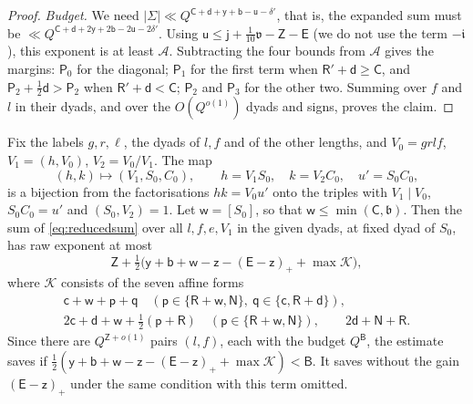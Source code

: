 \documentclass[11pt,colorlinks]{charlie}
\begin{document}
\begin{proof}
\emph{Budget.} We need $|\Sigma|\ll Q^{\mathsf C+\mathsf d+\mathsf y+\mathsf b-\mathsf u-\delta'}$, that is, the expanded sum must be $\ll Q^{\mathsf C+\mathsf d+2\mathsf y+2\mathsf b-2\mathsf u-2\delta'}$. Using $\mathsf u\le\mathsf j+\frac1{10}\mathfrak v-\mathsf Z-\mathsf E$ (we do not use the term $-\mathfrak i$), this exponent is at least $\mathcal A$. Subtracting the four bounds from $\mathcal A$ gives the margins: $\mathsf P_0$ for the diagonal; $\mathsf P_1$ for the first term when $\mathsf R'+\mathsf d\ge\mathsf C$, and $\mathsf P_2+\frac12\mathsf d>\mathsf P_2$ when $\mathsf R'+\mathsf d<\mathsf C$; $\mathsf P_2$ and $\mathsf P_3$ for the other two. Summing over $f$ and $l$ in their dyads, and over the $O(Q^{o(1)})$ dyads and signs, proves the claim.
\end{proof}

\begin{lemma}\label{lem:direct}
Fix the labels $g,r,\ell$, the dyads of $l,f$ and of the other lengths, and $V_0=grlf$, $V_1=(h,V_0)$, $V_2=V_0/V_1$. The map
\[
 (h,k)\longmapsto(V_1,S_0,C_0),\qquad h=V_1S_0,\quad k=V_2C_0,\quad u'=S_0C_0,
\]
is a bijection from the factorisations $hk=V_0u'$ onto the triples with $V_1\mid V_0$, $S_0C_0=u'$ and $(S_0,V_2)=1$. Let $\mathsf w=[S_0]$, so that $\mathsf w\le\min(\mathsf C,\mathfrak b)$. Then the sum of \eqref{eq:reducedsum} over all $l,f,e,V_1$ in the given dyads, at fixed dyad of $S_0$, has raw exponent at most
\[
 \mathsf Z+\tfrac12\big(\mathsf y+\mathsf b+\mathsf w-\mathsf z-(\mathsf E-\mathsf z)_+ +\max\mathcal K\big),
\]
where $\mathcal K$ consists of the seven affine forms
\begin{equation}\label{eq:Kset}
 \begin{gathered}
 \mathsf c+\mathsf w+\mathsf p+\mathsf q\quad(\mathsf p\in\{\mathsf R+\mathsf w,\mathsf N\},\ \mathsf q\in\{\mathsf c,\mathsf R+\mathsf d\}),\\
 2\mathsf c+\mathsf d+\mathsf w+\tfrac12(\mathsf p+\mathsf R)\quad(\mathsf p\in\{\mathsf R+\mathsf w,\mathsf N\}),\qquad
 2\mathsf d+\mathsf N+\mathsf R .
 \end{gathered}
\end{equation}
Since there are $Q^{\mathsf Z+o(1)}$ pairs $(l,f)$, each with the budget $Q^{\mathsf B}$, the estimate saves if $\frac12(\mathsf y+\mathsf b+\mathsf w-\mathsf z-(\mathsf E-\mathsf z)_++\max\mathcal K)<\mathsf B$. It saves without the gain $(\mathsf E-\mathsf z)_+$ under the same condition with this term omitted.
\end{lemma}
\end{document}

